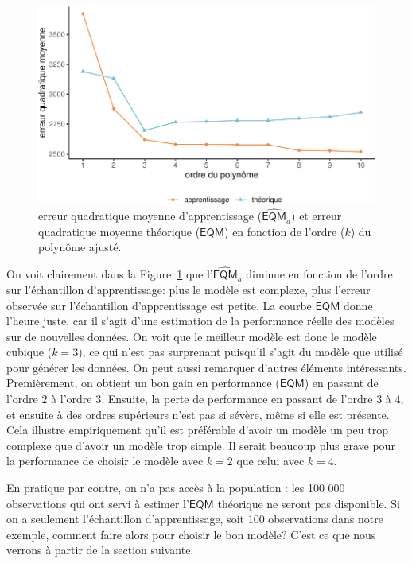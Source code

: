 \documentclass[
  11pt,
  letterpaper,
]{book}
\theoremstyle{definition}
\theoremstyle{remark}
\begin{document}
\begin{figure}[ht!]

{\centering \includegraphics[width=1\textwidth,height=\textheight]{./04-selectionmodeles_files/figure-pdf/fig-plotEQMa-1.pdf}

}

\caption{\label{fig-plotEQMa}erreur quadratique moyenne d'apprentissage
(\(\widehat{\mathsf{EQM}}_a\)) et erreur quadratique moyenne théorique
(\(\mathsf{EQM}\)) en fonction de l'ordre (\(k\)) du polynôme ajusté.}

\end{figure}

On voit clairement dans la Figure~\ref{fig-plotEQMa} que
l'\(\widehat{\mathsf{EQM}}_a\) diminue en fonction de l'ordre sur
l'échantillon d'apprentissage: plus le modèle est complexe, plus
l'erreur observée sur l'échantillon d'apprentissage est petite. La
courbe \(\mathsf{EQM}\) donne l'heure juste, car il s'agit d'une
estimation de la performance réelle des modèles sur de nouvelles
données. On voit que le meilleur modèle est donc le modèle cubique
(\(k=3\)), ce qui n'est pas surprenant puisqu'il s'agit du modèle que
utilisé pour générer les données. On peut aussi remarquer d'autres
éléments intéressants. Premièrement, on obtient un bon gain en
performance (\(\mathsf{EQM}\)) en passant de l'ordre \(2\) à l'ordre
\(3\). Ensuite, la perte de performance en passant de l'ordre \(3\) à
\(4\), et ensuite à des ordres supérieurs n'est pas si sévère, même si
elle est présente. Cela illustre empiriquement qu'il est préférable
d'avoir un modèle un peu trop complexe que d'avoir un modèle trop
simple. Il serait beaucoup plus grave pour la performance de choisir le
modèle avec \(k=2\) que celui avec \(k=4\).

En pratique par contre, on n'a pas accès à la population : les 100 000
observations qui ont servi à estimer l'\(\mathsf{EQM}\) théorique ne
seront pas disponible. Si on a seulement l'échantillon d'apprentissage,
soit 100 observations dans notre exemple, comment faire alors pour
choisir le bon modèle? C'est ce que nous verrons à partir de la section
suivante.
\end{document}
